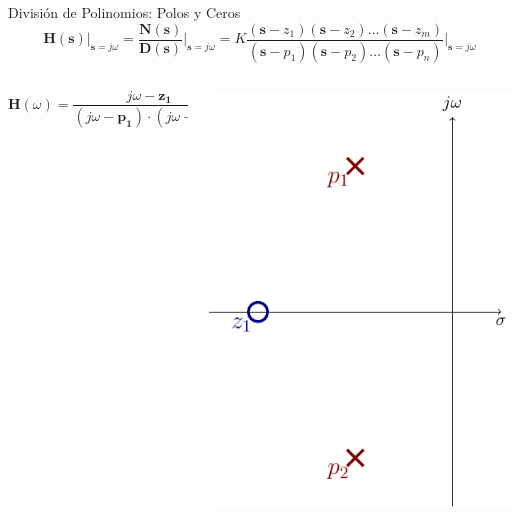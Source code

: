 \documentclass[aspectratio=169, usenames,svgnames,dvipsnames]{beamer}
\newcommand{\laplace}[1]{\mathbf{#1}(\mathbf{s})}
\newcommand{\slp}{\mathbf{s}}
\newcommand{\fasor}[1]{\mathbf{#1}(\omega)}
\begin{document}
\begin{frame}[label={sec:orgf4136d9}]{División de Polinomios: Polos y Ceros}
\[
  \boxed{\laplace{H}\rvert_{\slp = j\omega} = \frac{\laplace{N}}{\laplace{D}}\rvert_{\slp = j\omega} = K \frac{(\slp-z_1) (\slp - z_2) \ldots (\slp - z_m)}{(\slp-p_1) (\slp - p_2) \ldots (\slp - p_n)}\rvert_{\slp = j\omega} }
\]
\begin{columns}
\begin{column}{0.3\columnwidth}
\[
\fasor{H} = \frac{j\omega - \mathbf{z_1}}{(j\omega - \mathbf{p_1}) \cdot (j\omega - \mathbf{p_2})}
\]
\end{column}
\begin{column}{0.7\columnwidth}
\begin{center}
\includegraphics[height=0.65\textheight]{../figs/InterpretacionGeometrica0.pdf}
\end{center}
\end{column}
\end{columns}
\end{frame}
\end{document}
